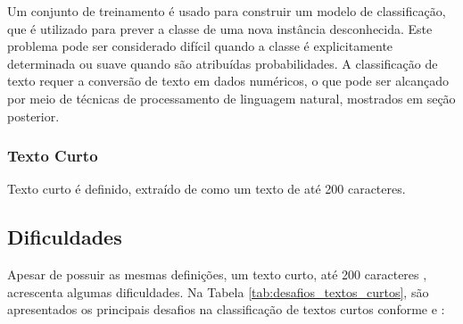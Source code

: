 Um conjunto de treinamento é usado para construir um modelo de classificação, que é utilizado para prever a classe de uma nova instância desconhecida. Este problema pode ser considerado difícil quando a classe é explicitamente determinada ou suave quando são atribuídas probabilidades. A classificação de texto requer a conversão de texto em dados numéricos, o que pode ser alcançado por meio de técnicas de processamento de linguagem natural, mostrados em seção posterior.

\subsubsection{Texto Curto}

Texto curto é definido, extraído de \cite{alsmadi2019review} como um texto de até 200 caracteres.

\subsection{Dificuldades}

Apesar de possuir as mesmas definições, um texto curto, até 200 caracteres \cite{alsmadi2019review}, acrescenta algumas dificuldades.  Na Tabela \ref{tab:desafios_textos_curtos}, são apresentados os principais desafios na classificação de textos curtos conforme \cite{alsmadi2019review} e \cite{song2014short}:


